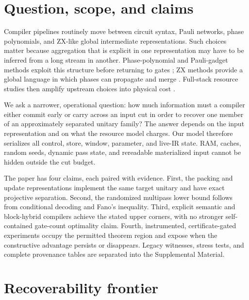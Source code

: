 \documentclass[aps,prx,reprint,floatfix,superscriptaddress]{revtex4-2}
\begin{document}
\maketitle

\section{Question, scope, and claims}
\label{sec:introduction}

Compiler pipelines routinely move between circuit syntax, Pauli networks,
phase polynomials, and ZX-like global intermediate representations.  Such
choices matter because aggregation that is explicit in one representation
may have to be inferred from a long stream in another.  Phase-polynomial and
Pauli-gadget methods exploit this structure before returning to gates
\cite{amy2014tdepth,nam2018automated,cowtan2020phase}; ZX methods provide a
global language in which phases can propagate and merge
\cite{duncan2020graph,kissinger2020reducing,kissinger2020pyzx}.  Full-stack
resource studies then amplify upstream choices into physical cost
\cite{fellous2023optimizing,watkins2024surfacecode}.

We ask a narrower, operational question: how much information must a
compiler either commit early or carry across an input cut in order to recover
one member of an approximately separated unitary family?  The answer depends
on the input representation and on what the resource model charges.  Our
model therefore serializes all control, store, window, parameter, and live-IR
state.  RAM, caches, random seeds, dynamic pass state, and rereadable
materialized input cannot be hidden outside the cut budget.

The paper has four claims, each paired with evidence.  First, the packing and
update representations implement the same target unitary and have exact
projective separation.  Second, the randomized multipass lower bound follows
from conditional decoding and Fano's inequality.  Third, explicit semantic
and block-hybrid compilers achieve the stated upper corners, with no stronger
self-contained gate-count optimality claim.  Fourth, instrumented,
certificate-gated experiments occupy the permitted theorem region and expose
when the constructive advantage persists or disappears.  Legacy witnesses,
stress tests, and complete provenance tables are separated into the
Supplemental Material.

\section{Recoverability frontier}
\label{sec:theory}
\end{document}
